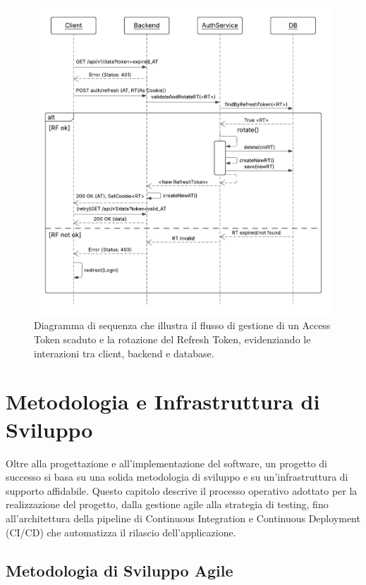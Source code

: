 \documentclass[12pt,a4paper,openright,twoside]{book}
\begin{document}
\begin{figure}[H]
    \centering
    \includegraphics[width=\textwidth]{figures/expired_ac.pdf}
    \caption{Diagramma di sequenza che illustra il flusso di gestione di un Access Token scaduto e la rotazione del Refresh Token, evidenziando le interazioni tra client, backend e database.}
    \label{fig:token_rotation_sequence_uml}
\end{figure}


\chapter{Metodologia e Infrastruttura di Sviluppo}
\label{chap:metodologia}

Oltre alla progettazione e all'implementazione del software, un progetto di successo si basa su una solida metodologia di sviluppo e su un'infrastruttura di supporto affidabile. Questo capitolo descrive il processo operativo adottato per la realizzazione del progetto, dalla gestione agile alla strategia di testing, fino all'architettura della pipeline di Continuous Integration e Continuous Deployment (CI/CD) che automatizza il rilascio dell'applicazione.

\section{Metodologia di Sviluppo Agile}
\label{sec:metodologia_agile}
\end{document}

